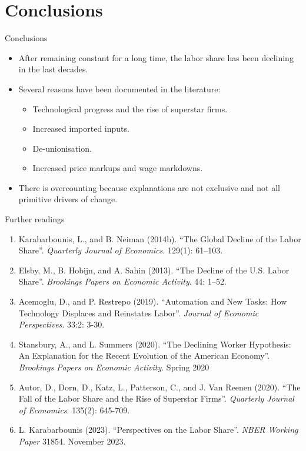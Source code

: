 \documentclass[notes=show]{beamer}
\begin{document}
\section{Conclusions}

\begin{frame}{Conclusions}
\begin{itemize}
\item After remaining constant for a long time, the labor share has been declining in the last decades. \medskip
\item Several reasons have been documented in the literature: \medskip
\begin{itemize}
    \item Technological progress and the rise of superstar firms. \medskip
    \item Increased imported inputs. \medskip
    \item De-unionisation. \medskip
    \item Increased price markups and wage markdowns. \medskip
\end{itemize}
\item There is overcounting because explanations are not exclusive and not all primitive drivers of change. 
\end{itemize}
\end{frame}

\begin{frame}{Further readings}
\footnotesize
\begin{enumerate}
\item Karabarbounis, L., and B. Neiman (2014b). “The Global Decline of the Labor Share”. \textit{Quarterly Journal of Economics}. 129(1): 61–103.
\item Elsby, M., B. Hobijn, and A. Sahin (2013). “The Decline of the U.S. Labor Share”. \textit{Brookings Papers on Economic Activity}. 44: 1–52.
\item Acemoglu, D., and P. Restrepo (2019). “Automation and New Tasks: How Technology Displaces and Reinstates Labor”. \textit{Journal of Economic Perspectives}. 33:2: 3-30.
\item Stansbury, A., and L. Summers (2020). “The Declining Worker Hypothesis: An Explanation for the Recent Evolution of the American Economy”. \textit{Brookings Papers on Economic Activity}. Spring 2020
\item Autor, D., Dorn, D., Katz, L., Patterson, C., and J. Van Reenen (2020). “The Fall of the Labor Share and the Rise of Superstar Firms”. \textit{ Quarterly Journal of Economics}. 135(2): 645-709.
\item L. Karabarbounis (2023). “Perspectives on the Labor Share”. \textit{NBER Working Paper} 31854. November 2023.
\end{enumerate}
\end{frame}
\end{document}
